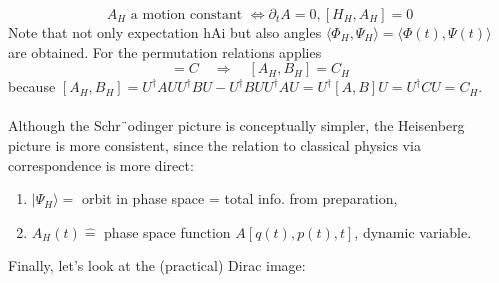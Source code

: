 \begin{equation}
    A_{H} \text { a motion constant } \Leftrightarrow \partial_{t} A=0,\left[H_{H}, A_{H}\right]=0
    \end{equation}
Note that not only expectation hAi but also angles $\langle\Phi_H,\Psi_H\rangle=\langle\Phi(t),\Psi(t)\rangle$ are obtained. For the permutation relations applies
\begin{equation}
    [A, B]=C \quad \Rightarrow \quad\left[A_{H}, B_{H}\right]=C_{H}
    \end{equation}
because $[A_H, B_H] = U^{\dagger}AUU^{\dagger}BU-U^{\dagger}BUU^{\dagger}AU=U^{\dagger}[A,B]U=U^{\dagger}CU=C_H$.\\\\
Although the Schr¨odinger picture is conceptually simpler, the Heisenberg picture is more consistent, since the relation to classical physics via correspondence is more direct:
\begin{enumerate}
    \item[] $|\Psi_H\rangle\hat{=}$ orbit in phase space = total info. from preparation,
    \item[] $A_H (t) \hat{=}$ phase space function $A [q (t), p (t), t]$, dynamic variable. 
\end{enumerate}
Finally, let's look at the (practical) Dirac image:
